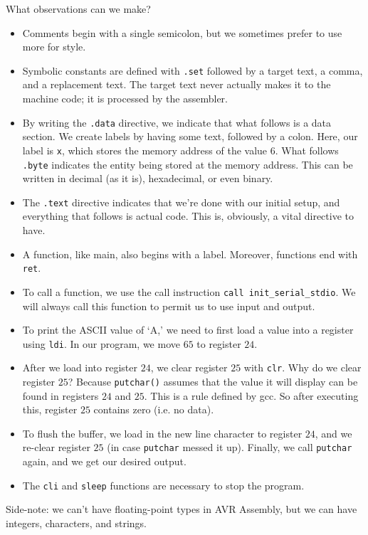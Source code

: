 What observations can we make? 
\begin{itemize}
    \item Comments begin with a single semicolon, but we sometimes prefer to use more for style.
    \item Symbolic constants are defined with \verb!.set! followed by a target text, a comma, and a replacement text. The target text never actually makes it to the machine code; it is processed by the assembler.
    \item By writing the \verb!.data! directive, we indicate that what follows is a data section. We create labels by having some text, followed by a colon. Here, our label is \verb!x!, which stores the memory address of the value $6$. What follows \verb!.byte! indicates the entity being stored at the memory address. This can be written in decimal (as it is), hexadecimal, or even binary. 
    \item The \verb!.text! directive indicates that we're done with our initial setup, and everything that follows is actual code. This is, obviously, a vital directive to have.
    \item A function, like main, also begins with a label. Moreover, functions end with \verb!ret!. 
    \item To call a function, we use the call instruction \verb!call init_serial_stdio!. We will always call this function to permit us to use input and output.
    \item To print the ASCII value of `A,' we need to first load a value into a register using \verb!ldi!. In our program, we move $65$ to register $24$. 
    \item After we load into register $24$, we clear register $25$ with \verb!clr!. Why do we clear register $25$? Because \verb!putchar()! assumes that the value it will display can be found in registers $24$ and $25$. This is a rule defined by gcc. So after executing this, register $25$ contains zero (i.e. no data).  
    \item To flush the buffer, we load in the new line character to register $24$, and we re-clear register $25$ (in case \verb!putchar! messed it up). Finally, we call \verb!putchar! again, and we get our desired output.
    \item The \verb!cli! and \verb!sleep! functions are necessary to stop the program. 
\end{itemize}










Side-note: we can't have floating-point types in AVR Assembly, but we can have integers, characters, and strings. 